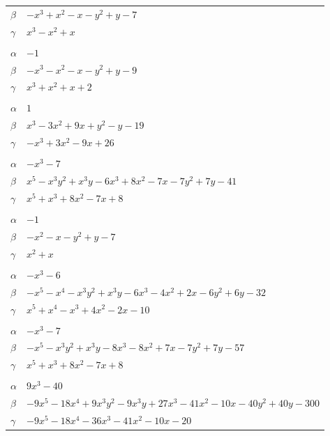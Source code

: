 \documentclass[11pt]{article}
\begin{document}
\begin{longtable}{@{}ll@{}}
$\beta$ & $-x^{3}+x^{2}-x-y^{2}+y-7$\\
$\gamma$ & $x^{3}-x^{2}+x$\\
\addlinespace[3pt]
\multicolumn{2}{@{}l}{$\{i,j\}=\{2,14\}$, $k_{ij}=2\cdot 3$}\\
$\alpha$ & $-1$\\
$\beta$ & $-x^{3}-x^{2}-x-y^{2}+y-9$\\
$\gamma$ & $x^{3}+x^{2}+x+2$\\
\addlinespace[3pt]
\multicolumn{2}{@{}l}{$\{i,j\}=\{2,15\}$, $k_{ij}=2\cdot 5\cdot 7$}\\
$\alpha$ & $1$\\
$\beta$ & $x^{3}-3x^{2}+9x+y^{2}-y-19$\\
$\gamma$ & $-x^{3}+3x^{2}-9x+26$\\
\addlinespace[3pt]
\multicolumn{2}{@{}l}{$\{i,j\}=\{2,19\}$, $k_{ij}=2^{4}\cdot 3$}\\
$\alpha$ & $-x^{3}-7$\\
$\beta$ & $x^{5}-x^{3}y^{2}+x^{3}y-6x^{3}+8x^{2}-7x-7y^{2}+7y-41$\\
$\gamma$ & $x^{5}+x^{3}+8x^{2}-7x+8$\\
\addlinespace[3pt]
\multicolumn{2}{@{}l}{$\{i,j\}=\{2,22\}$, $k_{ij}=2^{3}$}\\
$\alpha$ & $-1$\\
$\beta$ & $-x^{2}-x-y^{2}+y-7$\\
$\gamma$ & $x^{2}+x$\\
\addlinespace[3pt]
\multicolumn{2}{@{}l}{$\{i,j\}=\{2,32\}$, $k_{ij}=2^{2}\cdot 7$}\\
$\alpha$ & $-x^{3}-6$\\
$\beta$ & $-x^{5}-x^{4}-x^{3}y^{2}+x^{3}y-6x^{3}-4x^{2}+2x-6y^{2}+6y-32$\\
$\gamma$ & $x^{5}+x^{4}-x^{3}+4x^{2}-2x-10$\\
\addlinespace[3pt]
\multicolumn{2}{@{}l}{$\{i,j\}=\{2,33\}$, $k_{ij}=2^{4}\cdot 3$}\\
$\alpha$ & $-x^{3}-7$\\
$\beta$ & $-x^{5}-x^{3}y^{2}+x^{3}y-8x^{3}-8x^{2}+7x-7y^{2}+7y-57$\\
$\gamma$ & $x^{5}+x^{3}+8x^{2}-7x+8$\\
\addlinespace[3pt]
\multicolumn{2}{@{}l}{$\{i,j\}=\{2,36\}$, $k_{ij}=2^{6}\cdot 5$}\\
$\alpha$ & $9x^{3}-40$\\
$\beta$ & $-9x^{5}-18x^{4}+9x^{3}y^{2}-9x^{3}y+27x^{3}-41x^{2}-10x-40y^{2}+40y-300$\\
$\gamma$ & $-9x^{5}-18x^{4}-36x^{3}-41x^{2}-10x-20$\\

\end{longtable}
\end{document}
